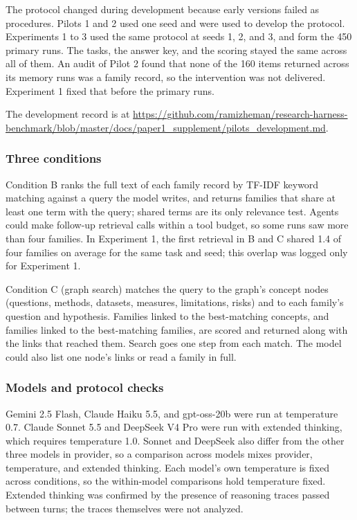 \documentclass[11pt]{article}
\begin{document}
The protocol changed during development because early versions failed as procedures. Pilots 1 and 2 used one seed and were used to develop the protocol. Experiments 1 to 3 used the same protocol at seeds 1, 2, and 3, and form the 450 primary runs. The tasks, the answer key, and the scoring stayed the same across all of them. An audit of Pilot 2 found that none of the 160 items returned across its memory runs was a family record, so the intervention was not delivered. Experiment 1 fixed that before the primary runs.

The development record is at \url{https://github.com/ramizheman/research-harness-benchmark/blob/master/docs/paper1_supplement/pilots_development.md}.

\subsubsection{Three conditions}

Condition B ranks the full text of each family record by TF-IDF keyword matching against a query the model writes, and returns families that share at least one term with the query; shared terms are its only relevance test. Agents could make follow-up retrieval calls within a tool budget, so some runs saw more than four families. In Experiment 1, the first retrieval in B and C shared 1.4 of four families on average for the same task and seed; this overlap was logged only for Experiment 1.

Condition C (graph search) matches the query to the graph's concept nodes (questions, methods, datasets, measures, limitations, risks) and to each family's question and hypothesis. Families linked to the best-matching concepts, and families linked to the best-matching families, are scored and returned along with the links that reached them. Search goes one step from each match. The model could also list one node's links or read a family in full.


\subsubsection{Models and protocol checks}

Gemini 2.5 Flash, Claude Haiku 5.5, and gpt-oss-20b were run at temperature 0.7. Claude Sonnet 5.5 and DeepSeek V4 Pro were run with extended thinking, which requires temperature 1.0. Sonnet and DeepSeek also differ from the other three models in provider, so a comparison across models mixes provider, temperature, and extended thinking. Each model's own temperature is fixed across conditions, so the within-model comparisons hold temperature fixed. Extended thinking was confirmed by the presence of reasoning traces passed between turns; the traces themselves were not analyzed.
\end{document}
